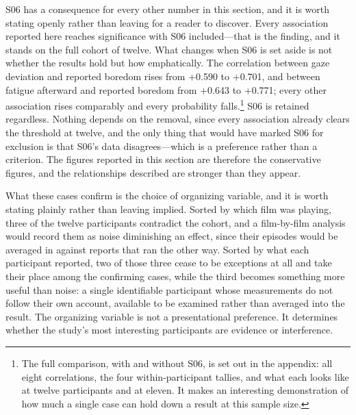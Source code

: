S06 has a consequence for every other number in this section, and it is worth stating openly
rather than leaving for a reader to discover. Every association reported here reaches
significance with S06 included---that is the finding, and it stands on the full cohort of
twelve. What changes when S06 is set aside is not whether the results hold but how emphatically.
The correlation between gaze deviation and reported boredom rises from $+$0.590 to $+$0.701, and
between fatigue afterward and reported boredom from $+$0.643 to $+$0.771; every other
association rises comparably and every probability falls.\footnote{The full comparison, with and
without S06, is set out in the appendix: all eight correlations, the four within-participant
tallies, and what each looks like at twelve participants and at eleven. It makes an interesting
demonstration of how much a single case can hold down a result at this sample size.} S06 is
retained regardless. Nothing depends on the removal, since every association already clears the
threshold at twelve, and the only thing that would have marked S06 for exclusion is that S06's
data disagrees---which is a preference rather than a criterion. The figures reported in this
section are therefore the conservative figures, and the relationships described are stronger
than they appear.

What these cases confirm is the choice of organizing variable, and it is worth stating plainly
rather than leaving implied. Sorted by which film was playing, three of the twelve participants
contradict the cohort, and a film-by-film analysis would record them as noise diminishing an
effect, since their episodes would be averaged in against reports that ran the other way. Sorted by what each participant reported, two of those three cease to be
exceptions at all and take their place among the confirming cases, while the third becomes
something more useful than noise: a single identifiable participant whose measurements do not
follow their own account, available to be examined rather than averaged into the result. The
organizing variable is not a presentational preference. It determines whether the study's most
interesting participants are evidence or interference.

